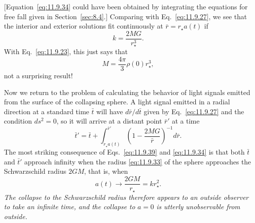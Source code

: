 [Equation~\eqref{eq:11.9.34} could have been obtained by integrating the
equations for free fall given in Section~\ref{sec:8.4}.] Comparing with
Eq.~\eqref{eq:11.9.27}, we see that the interior and exterior solutions fit
continuously at \(\bar r=r_\star a(t)\) if
\begin{equation}
  k=\frac{2MG}{r_\star^3}.
  \tag{11.9.37}\label{eq:11.9.37}
\end{equation}
With Eq.~\eqref{eq:11.9.23}, this just says that
\begin{equation}
  M=\frac{4\pi}{3}\rho(0)r_\star^3,
  \tag{11.9.38}\label{eq:11.9.38}
\end{equation}
not a surprising result!

Now we return to the problem of calculating the behavior of light signals
emitted from the surface of the collapsing sphere. A light signal emitted in
a radial direction at a standard time \(\bar t\) will have
\(d\bar r/d\bar t\) given by Eq.~\eqref{eq:11.9.27} and the condition
\(ds^2=0\), so it will arrive at a distant point \(\bar r'\) at a time
\begin{equation}
  \bar t'
  =
  \bar t+
  \int_{r_\star a(t)}^{\bar r'}
  \left(1-\frac{2MG}{\bar r}\right)^{-1}d\bar r.
  \tag{11.9.39}\label{eq:11.9.39}
\end{equation}
The most striking consequence of Eqs.~\eqref{eq:11.9.39} and
\eqref{eq:11.9.34} is that both \(\bar t\) and \(\bar t'\) approach infinity
when the radius \eqref{eq:11.9.33} of the sphere approaches the Schwarzschild
radius \(2GM\), that is, when
\begin{equation}
  a(t)\longrightarrow\frac{2GM}{r_\star}=kr_\star^2.
  \tag{11.9.40}\label{eq:11.9.40}
\end{equation}
\emph{The collapse to the Schwarzschild radius therefore appears to an
outside observer to take an infinite time, and the collapse to \(a=0\) is
utterly unobservable from outside.}

